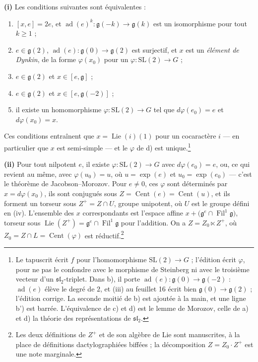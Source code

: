 \documentclass[11pt,a4paper]{article}
\begin{document}
\textbf{(i)} Les conditions suivantes sont équivalentes :

\begin{enumerate}
\item[a)] $[x,e]=2e$, et $\operatorname{ad}(e)^{k}\colon\mathfrak{g}(-k)\to
  \mathfrak{g}(k)$ est un isomorphisme pour tout $k\geqslant 1$ ;
\item[b)] $e\in\mathfrak{g}(2)$,
  $\operatorname{ad}(e)\colon\mathfrak{g}(0)\to\mathfrak{g}(2)$ est
  surjectif, et $x$ est un \emph{élément de Dynkin}, de la forme
  $\varphi(x_{0})$ pour un $\varphi\colon\mathrm{SL}(2)\to G$ ;
\item[c)] $e\in\mathfrak{g}(2)$ et $x\in[e,\mathfrak{g}]$ ;
\item[c')] $e\in\mathfrak{g}(2)$ et $x\in[e,\mathfrak{g}(-2)]$ ;
\item[d)] il existe un homomorphisme $\varphi\colon\mathrm{SL}(2)\to G$ tel que
  $d\varphi(e_{0})=e$ et $d\varphi(x_{0})=x$.
\end{enumerate}

Ces conditions entraînent que $x=\operatorname{Lie}(i)(1)$ pour un cocaractère
$i$ — en particulier que $x$ est semi-simple — et le $\varphi$ de d) est
unique.\footnote{Le tapuscrit écrit $f$ pour l'homomorphisme
$\mathrm{SL}(2)\to G$ ; l'édition écrit $\varphi$, pour ne pas le confondre avec
le morphisme de Steinberg ni avec le troisième vecteur d'un
$\mathfrak{sl}_{2}$-triplet. Dans b), il porte
$\operatorname{ad}(e)\colon\mathfrak{g}(0)\to\mathfrak{g}(-2)$ : $\operatorname{ad}(e)$
élève le degré de $2$, et (iii) au feuillet 16 écrit bien
$\mathfrak{g}(0)\to\mathfrak{g}(2)$ ; l'édition corrige. La seconde moitié de
b) est ajoutée à la main, et une ligne b') est barrée. L'équivalence de c) et
d) est le lemme de Morozov, celle de a) et d) la théorie des représentations
de $\mathfrak{sl}_{2}$.}

\textbf{(ii)} Pour tout nilpotent $e$, il existe $\varphi\colon\mathrm{SL}(2)\to
G$ avec $d\varphi(e_{0})=e$, ou, ce qui revient au même, avec
$\varphi(u_{0})=u$, où $u=\exp(e)$ et $u_{0}=\exp(e_{0})$ — c'est le théorème
de Jacobson--Morozov. Pour $e\neq 0$, ces $\varphi$ sont déterminés par
$x=d\varphi(x_{0})$, ils sont conjugués sous $Z=\operatorname{Cent}(e)=
\operatorname{Cent}(u)$, et ils forment un torseur sous $Z^{+}=Z\cap U$,
groupe unipotent, où $U$ est le groupe défini en (iv). L'ensemble des $x$
correspondants est l'espace affine
$x+\bigl(\mathfrak{g}^{e}\cap\operatorname{Fil}^{1}\mathfrak{g}\bigr)$, torseur
sous $\operatorname{Lie}(Z^{+})=\mathfrak{g}^{e}\cap
\operatorname{Fil}^{1}\mathfrak{g}$ pour l'addition. On a
$Z=Z_{0}\ltimes Z^{+}$, où $Z_{0}=Z\cap L=\operatorname{Cent}(\varphi)$ est
réductif.\footnote{Les deux définitions de $Z^{+}$ et de son algèbre de Lie
sont manuscrites, à la place de définitions dactylographiées biffées ; la
décomposition $Z=Z_{0}\cdot Z^{+}$ est une note marginale.}
\end{document}
